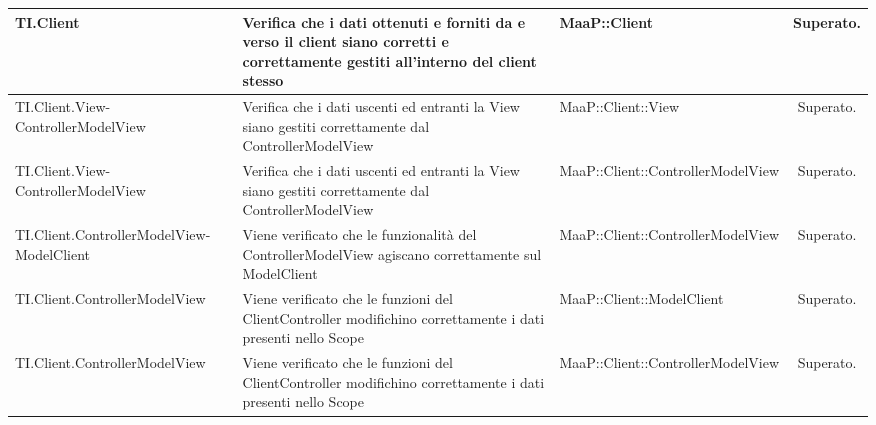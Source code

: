 \begin{center}
\begin{longtable}{|p{4.5cm}|p{3cm}|p{5.5cm}|c|}
\midrule
TI.Client
& Verifica che i dati ottenuti e forniti da e verso il client siano corretti e correttamente gestiti all'interno del client stesso
& MaaP::Client
& Superato.\\


\midrule
TI.Client.View-ControllerModelView
& Verifica che i dati uscenti ed entranti la View siano gestiti correttamente dal ControllerModelView
& MaaP::Client::View
& Superato.\\


\midrule
TI.Client.View-ControllerModelView
& Verifica che i dati uscenti ed entranti la View siano gestiti correttamente dal ControllerModelView
& MaaP::Client::ControllerModelView
& Superato.\\


\midrule
TI.Client.ControllerModelView-ModelClient
& Viene verificato che le funzionalità del ControllerModelView agiscano correttamente sul ModelClient
& MaaP::Client::ControllerModelView
& Superato.\\


\midrule
TI.Client.ControllerModelView
& Viene verificato che le funzioni del ClientController modifichino correttamente i dati presenti nello Scope
& MaaP::Client::ModelClient
& Superato.\\


\midrule
TI.Client.ControllerModelView
& Viene verificato che le funzioni del ClientController modifichino correttamente i dati presenti nello Scope
& MaaP::Client::ControllerModelView
& Superato.\\


\end{longtable}
\end{center}

